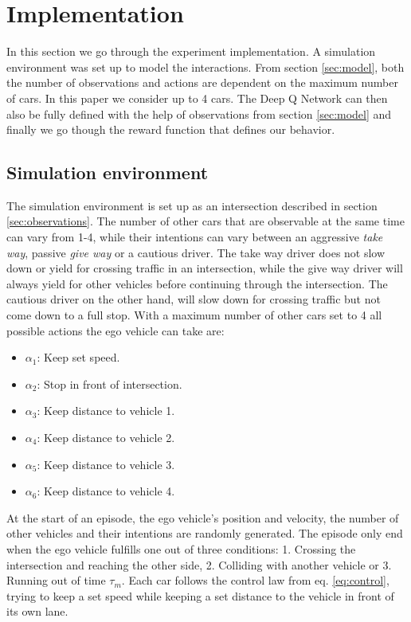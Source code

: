 \section{Implementation}
\label{sec:implementation}
In this section we go through the experiment implementation. A simulation environment was set up to model the interactions. From section \ref{sec:model}, both the number of observations and actions are dependent on the maximum number of cars. In this paper we consider up to 4 cars. The Deep Q Network can then also be fully defined with the help of observations from section \ref{sec:model} and finally we go though the reward function that defines our behavior. 

\subsection{Simulation environment}
\label{sec:simulation}
The simulation environment is set up as an intersection described in section \ref{sec:observations}. The number of other cars that are observable at the same time can vary from 1-4, while their intentions can vary between an aggressive {\em take way}, passive {\em give way} or a cautious driver. The take way driver does not slow down or yield for crossing traffic in an intersection, while the give way driver will always yield for other vehicles before continuing through the intersection. The cautious driver on the other hand, will slow down for crossing traffic but not come down to a full stop. With a maximum number of other cars set to 4 all possible actions the ego vehicle can take are:

\vspace{0.2cm}
\begin{itemize}
	\item $\alpha_1$: Keep set speed.
	\item $\alpha_2$: Stop in front of intersection.
	\item $\alpha_3$: Keep distance to vehicle 1.
	\item $\alpha_4$: Keep distance to vehicle 2.
	\item $\alpha_5$: Keep distance to vehicle 3.
	\item $\alpha_6$: Keep distance to vehicle 4.
\end{itemize}
\vspace{0.2cm}

At the start of an episode, the ego vehicle's position and velocity, the number of other vehicles and their intentions are randomly generated. The episode only end when the ego vehicle fulfills one out of  three conditions: 1. Crossing the intersection and reaching the other side, 2. Colliding with another vehicle or 3. Running out of time $\tau_m$. Each car follows the control law from eq. \ref{eq:control}, trying to keep a set speed while keeping a set distance to the vehicle in front of its own lane. 

